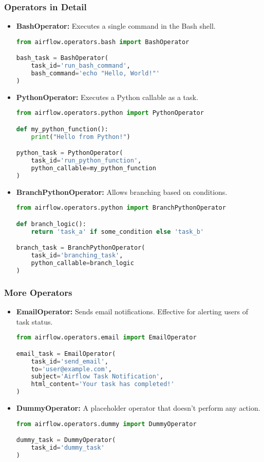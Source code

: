 \documentclass[aspectratio=169]{beamer}
\begin{document}
\begin{frame}[fragile]
    \frametitle{Operators in Detail}
    \begin{itemize}
        \item \textbf{BashOperator:} Executes a single command in the Bash shell.
        \begin{lstlisting}[language=Python]
from airflow.operators.bash import BashOperator

bash_task = BashOperator(
    task_id='run_bash_command',
    bash_command='echo "Hello, World!"'
)
        \end{lstlisting}

        \item \textbf{PythonOperator:} Executes a Python callable as a task.
        \begin{lstlisting}[language=Python]
from airflow.operators.python import PythonOperator

def my_python_function():
    print("Hello from Python!")

python_task = PythonOperator(
    task_id='run_python_function',
    python_callable=my_python_function
)
        \end{lstlisting}

        \item \textbf{BranchPythonOperator:} Allows branching based on conditions.
        \begin{lstlisting}[language=Python]
from airflow.operators.python import BranchPythonOperator

def branch_logic():
    return 'task_a' if some_condition else 'task_b'

branch_task = BranchPythonOperator(
    task_id='branching_task',
    python_callable=branch_logic
)
        \end{lstlisting}
    \end{itemize}
\end{frame}

\begin{frame}[fragile]
    \frametitle{More Operators}
    \begin{itemize}
        \item \textbf{EmailOperator:} Sends email notifications. Effective for alerting users of task status.
        \begin{lstlisting}[language=Python]
from airflow.operators.email import EmailOperator

email_task = EmailOperator(
    task_id='send_email',
    to='user@example.com',
    subject='Airflow Task Notification',
    html_content='Your task has completed!'
)
        \end{lstlisting}

        \item \textbf{DummyOperator:} A placeholder operator that doesn’t perform any action.
        \begin{lstlisting}[language=Python]
from airflow.operators.dummy import DummyOperator

dummy_task = DummyOperator(
    task_id='dummy_task'
)
        \end{lstlisting}
    \end{itemize}
\end{frame}
\end{document}
